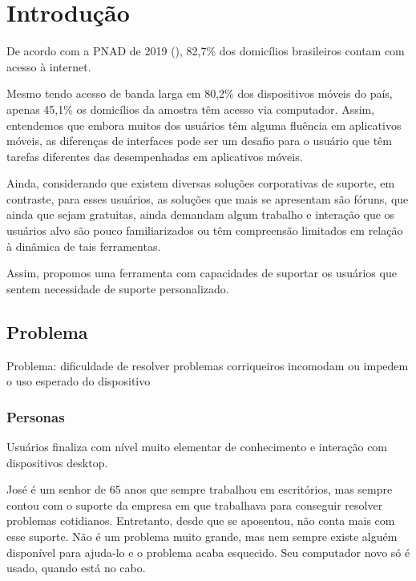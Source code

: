 \documentclass[
    12pt,               %
    openright,          %
    oneside,
    a4paper,            %
    MODELO,             %
    english,            %
    brazil              %
   ]{ifsp-spo-inf-ctds}
\begin{document}
\frenchspacing 

\pretextual

\imprimirfolhaderosto

\textual

\chapter[Introdução]{Introdução}

De acordo com a PNAD de 2019 (\citeauthor{PNAD:2019}), 82,7\% dos domicílios brasileiros contam com acesso à internet.

Mesmo tendo acesso de banda larga em 80,2\% dos dispositivos móveis do país, apenas 45,1\% os domicílios da amostra têm acesso via computador. Assim, entendemos que embora muitos dos usuários têm alguma fluência em aplicativos móveis, as diferenças de interfaces pode ser um desafio para o usuário que têm tarefas diferentes das desempenhadas em aplicativos móveis.

Ainda, considerando que existem diversas soluções corporativas de suporte, em contraste, para esses usuários, as soluções que mais se apresentam são fóruns, que ainda que sejam gratuitas, ainda demandam algum trabalho e interação que os usuários alvo são pouco familiarizados ou têm compreensão limitados em relação à dinâmica de tais ferramentas.

Assim, propomos uma ferramenta com capacidades de suportar os usuários que sentem necessidade de suporte personalizado.

\section{Problema}
Problema: dificuldade de resolver problemas corriqueiros incomodam ou impedem o uso esperado do dispositivo

\subsection{Personas}
Usuários finaliza com nível muito elementar de conhecimento e interação com dispositivos desktop.

José é um senhor de 65 anos que sempre trabalhou em escritórios, mas sempre contou com o suporte da empresa em que trabalhava para conseguir resolver problemas cotidianos. Entretanto, desde que se aposentou, não conta mais com esse suporte. Não é um problema muito grande, mas nem sempre existe alguém disponível para ajuda-lo e o problema acaba esquecido. Seu computador novo só é usado, quando está no cabo.
\end{document}
